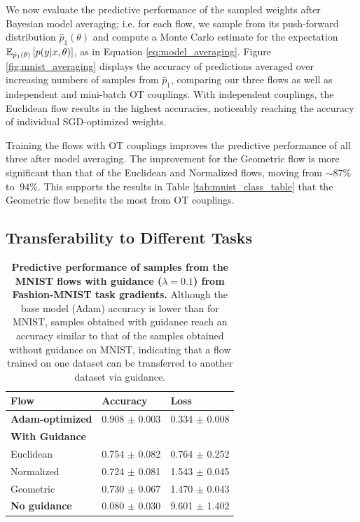 We now evaluate the predictive performance of the sampled weights after Bayesian model averaging; i.e. for each flow, we sample from its push-forward distribution $\hat p_1 (\theta)$ and compute a Monte Carlo estimate for the expectation $\mathbb{E}_{\hat p_1 (\theta)} \left[ p(y\vert x, \theta) \right]$, as in Equation \ref{eq:model_averaging}. Figure \ref{fig:mnist_averaging} displays the accuracy of predictions averaged over increasing numbers of samples from $\hat p_1$, comparing our three flows as well as independent and mini-batch OT couplings. With independent couplings, the Euclidean flow results in the highest accuracies, noticeably reaching the accuracy of individual SGD-optimized weights. 

Training the flows with OT couplings improves the predictive performance of all three after model averaging. The improvement for the Geometric flow is more significant than that of the Euclidean and Normalized flows, moving from $\sim87\%$ to $~94\%$. This supports the results in Table \ref{tab:mnist_class_table} that the Geometric flow benefits the most from OT couplings. 

\subsection{Transferability to Different Tasks} \label{sec:task_generalization}

\begin{table}[t!]
    \centering
    \begin{tabular}{lll}
        \toprule
        \textbf{Flow} & \textbf{Accuracy} & \textbf{Loss} \\
        \midrule
        \textbf{Adam-optimized} & 0.908 $\pm$ 0.003 & 0.334 $\pm$ 0.008 \\
        \midrule
        \textbf{With Guidance} & & \\
        Euclidean   & 0.754 $\pm$ 0.082     & 0.764 $\pm$ 0.252 \\
        Normalized  & 0.724 $\pm$ 0.081     & 1.543 $\pm$ 0.045 \\
        Geometric   & 0.730 $\pm$ 0.067     & 1.470 $\pm$ 0.043 \\
        \midrule
        \textbf{No guidance} & 0.080 $\pm$ 0.030 & 9.601 $\pm$ 1.402 \\ 
        \bottomrule
    \end{tabular}
    \caption{\label{tab:mnist_generalization}\textbf{Predictive performance of samples from the MNIST flows with guidance ($\lambda = 0.1$) from Fashion-MNIST task gradients.} Although the base model (Adam) accuracy is lower than for MNIST, samples obtained with guidance reach an accuracy similar to that of the samples obtained without guidance on MNIST, indicating that a flow trained on one dataset can be transferred to another dataset via guidance. }
\end{table}

